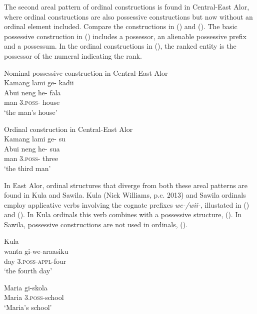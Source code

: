 The second areal pattern of ordinal constructions is found in Central-East Alor, where ordinal constructions are also possessive constructions but now without an ordinal element included. Compare the constructions in () and (). The basic possessive construction in () includes a possessor, an alienable possessive prefix and a possessum. In the ordinal constructions in (), the ranked entity is the possessor of the numeral indicating the rank.

\ea%
\label{bkm:Ref342649962}
   Nominal possessive construction in Central-East Alor \\
\glll  Kamang  lami  ge-  kadii \\
     Abui     neng  he-  fala  \\
     {}      man  3\textsc{.poss- } house\\
 \glt `the man's house'
\z

\ea%
\label{bkm:Ref342309284}
    Ordinal construction in Central-East Alor\\
\glll Kamang   lami  ge- su \\
    Abui     neng  he-  sua   \\
      man  3\textsc{.poss-}  three\\
\glt  `the third man'
\z


In East Alor, ordinal structures that diverge from both these areal patterns are found in Kula and Sawila. Kula (Nick Williams, p.c. 2013) and Sawila ordinals employ applicative verbs involving the cognate prefixes \textit{we-/wii-}, illustated in () and (). In Kula ordinals this verb combines with a possessive structure, (). In Sawila, possessive constructions  are not used in ordinals, ().


\ea%
\label{bkm:Ref355275027}
Kula\\
\gll wanta   gi-we-araasiku\\
  day   3.\textsc{poss}{}-\textsc{appl}{}-four  \\
\glt  `the fourth day'
\z


\ea%
\label{bkm:Ref358037937}
\gll Maria   gi-skola\\
   Maria   3.\textsc{poss-}school \\
\glt`Maria's school'
\z






